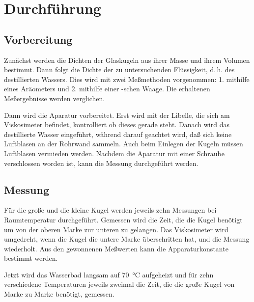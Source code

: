 
\section{Durchführung}

\subsection{Vorbereitung}

Zunächst werden die Dichten der Glaskugeln aus ihrer Masse und ihrem
Volumen bestimmt. Dann folgt die Dichte der zu untersuchenden
Flüssigkeit, d.\,h. des destillierten Wassers. Dies wird mit zwei
Meßmethoden vorgenommen: 1. mithilfe eines Aräometers und 2. mithilfe
einer -schen Waage. Die erhaltenen
Meßergebnisse werden verglichen.

Dann wird die Aparatur vorbereitet. Erst wird mit der Libelle, die sich
am Viskosimeter befindet, kontrolliert ob dieses gerade steht. Danach
wird das destillierte Wasser eingeführt, während darauf geachtet wird,
daß sich keine Luftblasen an der Rohrwand sammeln. Auch beim Einlegen
der Kugeln müssen Luftblasen vermieden werden. Nachdem die Aparatur mit
einer Schraube verschlossen worden ist, kann die Messung durchgeführt
werden.

\subsection{Messung}

Für die große und die kleine Kugel werden jeweils zehn Messungen bei
Raumtemperatur durchgeführt. Gemessen wird die Zeit, die die Kugel
benötigt um von der oberen Marke zur unteren zu gelangen. Das
Viskosimeter wird umgedreht, wenn die Kugel die untere Marke
überschritten hat, und die Messung wiederholt. Aus den gewonnenen
Meßwerten kann die Apparaturkonstante bestimmt werden.

Jetzt wird das Wasserbad langsam auf \SI{70}{\degreeCelsius} aufgeheizt
und für zehn verschiedene Temperaturen jeweils zweimal die Zeit, die die
große Kugel von Marke zu Marke benötigt, gemessen.
